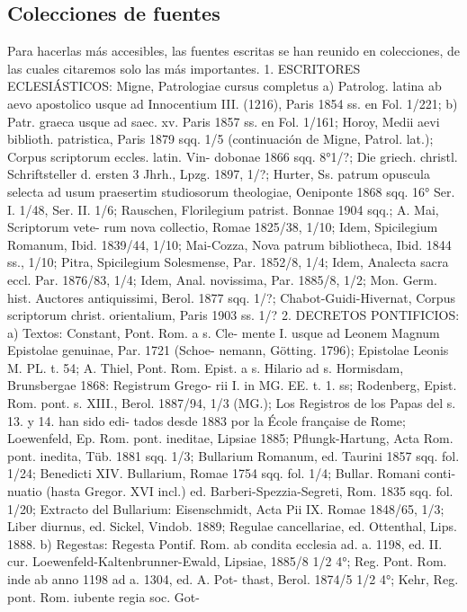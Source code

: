 \raggedbottom{} \documentclass[12pt, a4paper]{book}
\begin{document}
\subsection{Colecciones de fuentes} Para hacerlas más accesibles, las fuentes escritas se han reunido en
colecciones, de las cuales citaremos solo las más importantes.
1. ESCRITORES ECLESIÁSTICOS: Migne, Patrologiae cursus completus
a) Patrolog. latina ab aevo apostolico usque ad Innocentium III. (1216),
Paris 1854 ss. en Fol. 1/221; b) Patr. graeca usque ad saec. xv. Paris 1857
ss. en Fol. 1/161; Horoy, Medii aevi biblioth. patristica, Paris 1879 sqq. 1/5
(continuación de Migne, Patrol. lat.); Corpus scriptorum eccles. latin. Vin-
dobonae 1866 sqq. 8°1/?; Die griech. christl. Schriftsteller d. ersten 3 Jhrh.,
Lpzg. 1897, 1/?; Hurter, Ss. patrum opuscula selecta ad usum praesertim
studiosorum theologiae, Oeniponte 1868 sqq. 16° Ser. I. 1/48, Ser. II. 1/6;
Rauschen, Florilegium patrist. Bonnae 1904 sqq.; A. Mai, Scriptorum vete-
rum nova collectio, Romae 1825/38, 1/10; Idem, Spicilegium Romanum, Ibid.
1839/44, 1/10; Mai-Cozza, Nova patrum bibliotheca, Ibid. 1844 ss., 1/10;
Pitra, Spicilegium Solesmense, Par. 1852/8, 1/4; Idem, Analecta sacra eccl.
Par. 1876/83, 1/4; Idem, Anal. novissima, Par. 1885/8, 1/2; Mon. Germ. hist.
Auctores antiquissimi, Berol. 1877 sqq. 1/?; Chabot-Guidi-Hivernat, Corpus
scriptorum christ. orientalium, Paris 1903 ss. 1/?
2. DECRETOS PONTIFICIOS: a) Textos: Constant, Pont. Rom. a s. Cle-
mente I. usque ad Leonem Magnum Epistolae genuinae, Par. 1721 (Schoe-
nemann, Götting. 1796); Epistolae Leonis M. PL. t. 54; A. Thiel, Pont. Rom.
Epist. a s. Hilario ad s. Hormisdam, Brunsbergae 1868: Registrum Grego-
rii I. in MG. EE. t. 1. ss; Rodenberg, Epist. Rom. pont. s. XIII., Berol.
1887/94, 1/3 (MG.); Los Registros de los Papas del s. 13. y 14. han sido edi-
tados desde 1883 por la École française de Rome; Loewenfeld, Ep. Rom.
pont. ineditae, Lipsiae 1885; Pflungk-Hartung, Acta Rom. pont. inedita,
Tüb. 1881 sqq. 1/3; Bullarium Romanum, ed. Taurini 1857 sqq. fol. 1/24;
Benedicti XIV. Bullarium, Romae 1754 sqq. fol. 1/4; Bullar. Romani conti-
nuatio (hasta Gregor. XVI incl.) ed. Barberi-Spezzia-Segreti, Rom. 1835
sqq. fol. 1/20; Extracto del Bullarium: Eisenschmidt, Acta Pii IX. Romae
1848/65, 1/3; Liber diurnus, ed. Sickel, Vindob. 1889; Regulae cancellariae,
ed. Ottenthal, Lips. 1888. b) Regestas: Regesta Pontif. Rom. ab condita
ecclesia ad. a. 1198, ed. II. cur. Loewenfeld-Kaltenbrunner-Ewald, Lipsiae,
1885/8 1/2 4°; Reg. Pont. Rom. inde ab anno 1198 ad a. 1304, ed. A. Pot-
thast, Berol. 1874/5 1/2 4°; Kehr, Reg. pont. Rom. iubente regia soc. Got-
\end{document}
